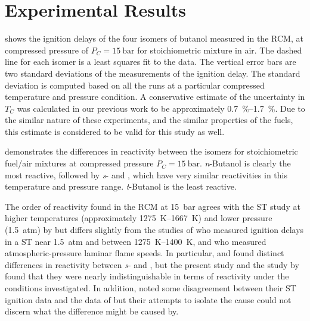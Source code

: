 \documentclass[../main.tex]{subfiles}
\begin{document}
\section{Experimental Results}
\label{sec:buoh-expts}

 shows the ignition delays of the four isomers of
butanol measured in the RCM, at compressed pressure of $P_C=\SI{15}{\bar}$ for
stoichiometric mixture in air. The dashed line for each isomer is a least
squares fit to the data. The vertical error bars are two standard deviations
of the measurements of the ignition delay. The standard deviation is computed
based on all the runs at a particular compressed temperature and pressure
condition. A conservative estimate of the uncertainty in $T_C$ was calculated
in our previous work to be approximately \SIrange{0.7}{1.7}{\percent}. Due to the similar nature
of these experiments, and the similar properties of the fuels, this estimate
is considered to be valid for this study as well.

 demonstrates the differences in reactivity between
the isomers for stoichiometric fuel/air mixtures at compressed pressure
$P_C=\SI{15}{\bar}$. \textit{n}-Butanol is clearly the most reactive, followed by
\textit{s}- and \iBuOH{}, which have very similar reactivities in
this temperature and pressure range. \textit{t}-Butanol is the least reactive.

The order of reactivity found in the RCM at \SI{15}{\bar} agrees with the ST
study at higher temperatures (approximately \SIrange{1275}{1667}{\kelvin}) and lower pressure
(\SI{1.5}{atm}) by \textcite{Stranic2012} but differs slightly from the studies of
\textcite{Moss2008} who measured ignition delays in a ST near \SI{1.5}{atm}
and between \SIrange{1275}{1400}{\kelvin}, and \textcite{Veloo2011a} who measured
atmospheric-pressure laminar flame speeds. In particular, \textcite{Moss2008}
and \textcite{Veloo2011a} found distinct differences in reactivity between
\textit{s}- and \iBuOH{}, but the present study and the study by
\textcite{Stranic2012} found that they were nearly indistinguishable in terms
of reactivity under the conditions investigated. In addition,
\textcite{Stranic2012} noted some disagreement between their ST
ignition data and the data of \textcite{Moss2008} but their attempts to isolate
the cause could not discern what the difference might be caused by.
\end{document}
